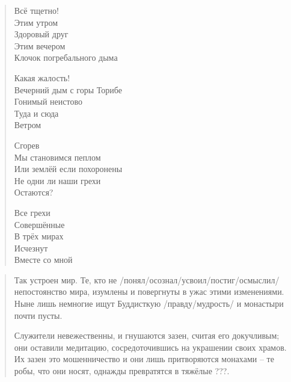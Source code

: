 \begin{ver}
\begin{quote}
\begin{verses}
      Всё тщетно!\\
      Этим утром\\
      Здоровый друг\\
      Этим вечером\\
      Клочок погребального дыма

      Какая жалость!\\
      Вечерний дым с горы Торибе\\
      Гонимый неистово\\
      Туда и сюда\\
      Ветром

      Сгорев\\
      Мы становимся пеплом\\
      Или землёй если похоронены\\
      Не одни ли наши грехи\\
      Остаются?

      Все грехи\\
      Совершённые\\
      В трёх мирах\\
      Исчезнут\\
      Вместе со мной
    \end{verses}
  \end{quote}
\end{ver}




\begin{ver}
  \begin{quote}
    Так устроен мир. Те, кто не
    /понял/осознал/усвоил/постиг/осмыслил/ непостоянство
    мира, изумлены и повергнуты в ужас этими изменениями. Ныне лишь
    немногие ищут Буддисткую /правду/мудрость/ и монастыри почти
    пусты.
    
    Служители невежественны, и гнушаются зазен, считая его докучливым;
    они оставили медитацию, сосредоточившись на украшении своих
    храмов.
    Их зазен это мошенничество и они лишь притворяются монахами -- те
    робы, что они носят, однажды превратятся в тяжёлые ???.
  \end{quote}
\end{ver}

